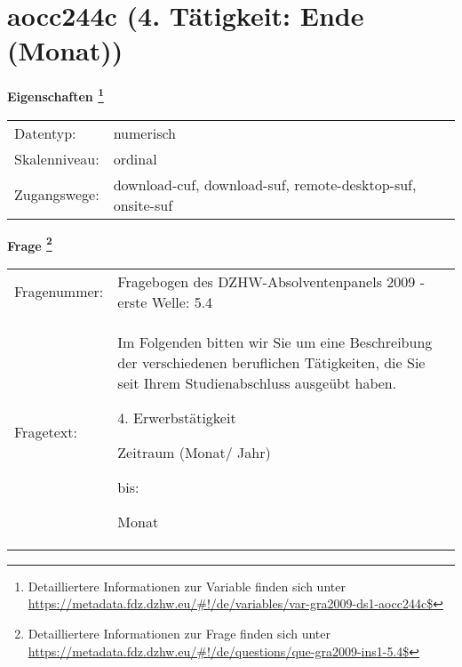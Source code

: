 
    \setcounter{footnote}{0}

    \vspace*{-1.8cm}
	\section{aocc244c (4. Tätigkeit: Ende (Monat))}
	\label{section:aocc244c}



    \vspace*{0.5cm}
    \noindent\textbf{Eigenschaften
	\footnote{Detailliertere Informationen zur Variable finden sich unter
		\url{https://metadata.fdz.dzhw.eu/\#!/de/variables/var-gra2009-ds1-aocc244c$}}}\\
	\begin{tabularx}{\hsize}{@{}lX}
	Datentyp: & numerisch \\
	Skalenniveau: & ordinal \\
	Zugangswege: &
	  download-cuf, 
	  download-suf, 
	  remote-desktop-suf, 
	  onsite-suf
 \\
    \end{tabularx}



				\vspace*{0.5cm}
                \noindent\textbf{Frage
	                \footnote{Detailliertere Informationen zur Frage finden sich unter
		              \url{https://metadata.fdz.dzhw.eu/\#!/de/questions/que-gra2009-ins1-5.4$}}}\\
				\begin{tabularx}{\hsize}{@{}lX}
					Fragenummer: &
					  Fragebogen des DZHW-Absolventenpanels 2009 - erste Welle:
					  5.4
 \\
					Fragetext: & Im Folgenden bitten wir Sie um eine Beschreibung der verschiedenen beruflichen Tätigkeiten, die Sie seit Ihrem Studienabschluss ausgeübt haben.\par  4. Erwerbstätigkeit\par  Zeitraum (Monat/ Jahr)\par  bis:\par  Monat \\
				\end{tabularx}





